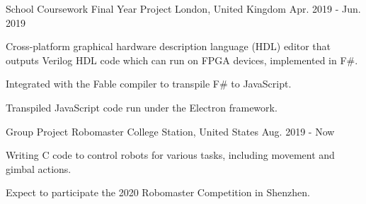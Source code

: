 \begin{cventries}
    \cventry
    {School Coursework} %
    {Final Year Project} %
    {London, United Kingdom} %
    {Apr. 2019 - Jun. 2019} %
    {
      \begin{cvitems} %
        \item {Cross-platform graphical hardware description language (HDL) editor that outputs Verilog HDL code which can run on FPGA devices, implemented in F\#.}
        \item {Integrated with the Fable compiler to transpile F\# to JavaScript.}
        \item {Transpiled JavaScript code run under the Electron framework.}
      \end{cvitems}
    }
    
    \cventry
    {Group Project} %
    {Robomaster} %
    {College Station, United States} %
    {Aug. 2019 - Now} %
    {
      \begin{cvitems} %
        \item {Writing C code to control robots for various tasks, including movement and gimbal actions.}
        \item {Expect to participate the 2020 Robomaster Competition in Shenzhen.}
      \end{cvitems}
    }

\end{cventries}
